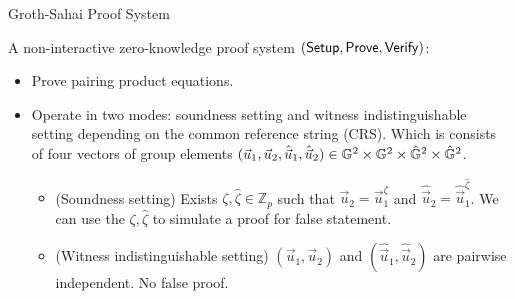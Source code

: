 \begin{frame}{Groth-Sahai Proof System}

  A non-interactive zero-knowledge proof system $({\mathsf{Setup}}, {\mathsf{Prove}}, {\mathsf{Verify}})$:
  \pause
  \begin{itemize}
  \item Prove pairing product equations.
  \item Operate in two modes: soundness setting and witness indistinguishable setting depending on the common reference string (CRS). Which is consists of four vectors of group elements $(\vec{u}_1, \vec{u}_2, \hat{\vec{u}}_1, \hat{\vec{u}}_2) \in \mathbb{G}^2 \times \mathbb{G}^2 \times \hat{\mathbb{G}}^2 \times \hat{\mathbb{G}}^2$.
  	\begin{itemize}
  	\item  (Soundness setting) Exists $\zeta, \hat{\zeta} \in \mathbb{Z}_p$ such that $\vec{u}_2 = \vec{u}_1^\zeta$ and $\hat{\vec{u}}_2 = \hat{\vec{u}}_1^{\hat{\zeta}}$. We can use the $\zeta, \hat{\zeta}$ to simulate a proof for false statement.
  	\item (Witness indistinguishable setting) $(\vec{u}_1, \vec{u}_2)$ and $(\hat{\vec{u}}_1,  \hat{\vec{u}}_2)$ are pairwise independent. No false proof.
  	\end{itemize}
  \end{itemize}
  
\end{frame}





